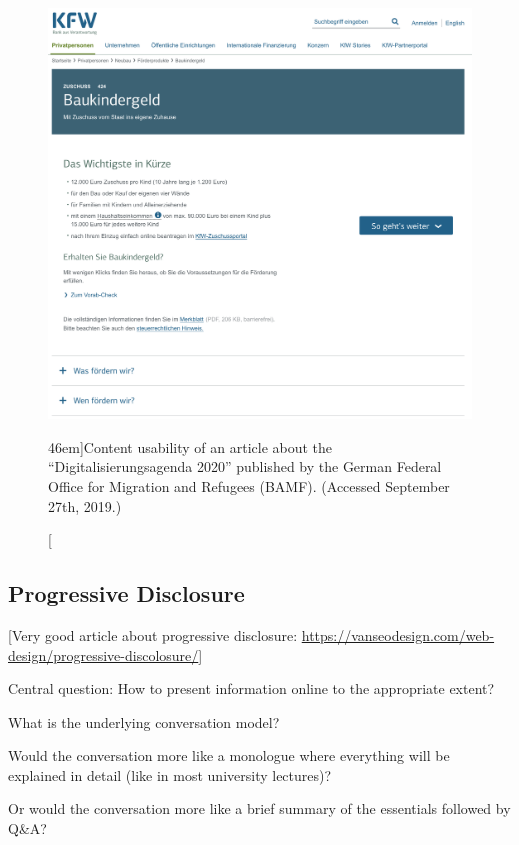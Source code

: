 \begin{figure}%
  \includegraphics[width=1.54\textwidth]{../figures/content_usability_kfw.png}
  \caption[][46em]{Content usability of an article about the ``Digitalisierungsagenda 2020'' published by the German Federal Office for Migration and Refugees (BAMF). (Accessed September 27th, 2019.) }
  \label{fig:content_usability_kfw}
\end{figure}




\subsection{Progressive Disclosure} %
\label{sub:progressive_disclosure}

[Very good article about progressive disclosure: \url{https://vanseodesign.com/web-design/progressive-discolosure/}]

Central question:
How to present information online to the appropriate extent?

What is the underlying conversation model?

Would the conversation more like a monologue where everything will be explained in detail (like in most university lectures)?

Or would the conversation more like a brief summary of the essentials followed by Q\&A? 

